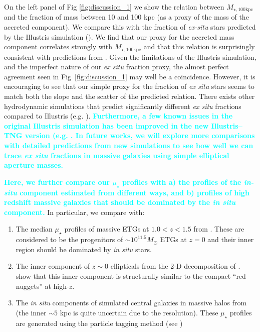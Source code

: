 \documentclass[a4paper,fleqn,usenatbib]{mnras}
\def\mtot{{$M_{\star,100\mathrm{kpc}}$}}
\def\mden{{$\mu_{\star}$}}
\newcommand{\song}[1]{\textcolor{cyan}{\textbf{#1}}}
\begin{document}
    On the left panel of Fig \ref{fig:discussion_1} we show the relation between 
    \mtot{} and the fraction of mass between 10 and 100 kpc (as a proxy of the mass of 
    the accreted component).
    We compare this with the fraction of \textit{ex-situ} stars predicted by the 
    Illustris simulation (\citealt{RodriguezGomez2016}).  
    We find that our proxy for the accreted mass component correlates strongly with  
    \mtot{} and that this relation is surprisingly consistent with predictions from
    \citet{RodriguezGomez2016}.  
    Given the limitations of the Illustris simulation, and the imperfect nature of 
    our \textit{ex situ} fraction proxy, the almost perfect agreement seen in 
    Fig~\ref{fig:discussion_1} may well be a coincidence.  
    However, it is encouraging to see that our simple proxy for the fraction of 
    \textit{ex situ} stars seems to match both the slope and the scatter of the 
    predicted relation.  
    There exists other hydrodynamic simulations that predict significantly different 
    \textit{ex situ} fractions compared to Illustris (e.g. \citealt{Lackner2012, 
    Qu2017}). 
    \song{
    Furthermore, a few known issues in the original Illustris simulation has been 
    improved in the new Illustris--TNG version (e.g. \citealt{Genel2017, 
    Pillepich2017}.
    In future works, we will explore more comparisons with detailed predictions 
    from new simulations to see how well we can trace \textit{ex situ} fractions
    in massive galaxies using simple elliptical aperture masses.
    }
    
    \song{
    Here, we further compare our \mden{} profiles with 
    a) the profiles of the \textit{in-situ} component estimated from different ways,
    and b) profiles of high redshift massive galaxies that should be dominated by 
    the \textit{in situ} component.  
    }
    In particular, we compare with:
  
    \begin{enumerate}
        
        \item The median \mden{} profiles of massive ETGs at $1.0 < z < 1.5$ from
            \citealt{Patel2013}.
            These are considered to be the progenitors of 
            ${\sim} 10^{11.5} M_{\odot}$ ETGs at $z=0$ and their inner region 
            should be dominated by \textit{in situ} stars. 
    
        \item The inner component of $z{\sim} 0$ ellipticals from the 2-D 
            decomposition of \citet{Huang2013a}. 
            \citet{Huang2013b} show that this inner component is structurally 
            similar to the compact ``red nuggets'' at high-$z$. 
            
        \item The \textit{in situ} components of simulated central galaxies in 
            massive halos from \citet{Cooper2013} (the inner ${\sim} 5$ kpc is 
            quite uncertain due to the resolution).  
            These \mden{} profiles are generated using the particle tagging 
            method (see \citealt{Cooper2010})
    
    \end{enumerate}
    
\end{document}

